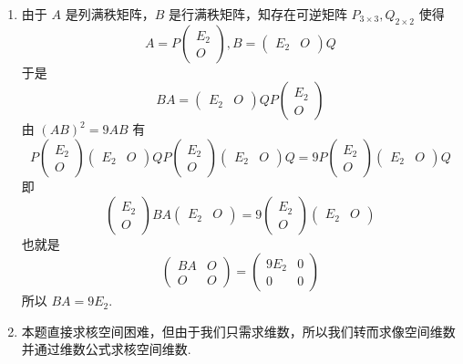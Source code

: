 \begin{enumerate}
    \item 由于 $A$ 是列满秩矩阵，$B$ 是行满秩矩阵，知存在可逆矩阵 $P_{3\times 3},Q_{2\times 2}$ 使得
          \[A=P\begin{pmatrix}E_2 \\ O\end{pmatrix},B=\begin{pmatrix}E_2 & O\end{pmatrix}Q\]
          于是
          \[BA=\begin{pmatrix}E_2 & O\end{pmatrix}QP\begin{pmatrix}E_2 \\ O\end{pmatrix}\]
          由 $(AB)^2=9AB$ 有 \[P\begin{pmatrix}E_2 \\ O\end{pmatrix}\begin{pmatrix}E_2 & O\end{pmatrix}QP\begin{pmatrix}E_2 \\ O\end{pmatrix}\begin{pmatrix}E_2 & O\end{pmatrix}Q=9P\begin{pmatrix}E_2 \\ O\end{pmatrix}\begin{pmatrix}E_2 & O\end{pmatrix}Q\]
          即
          \[\begin{pmatrix}E_2 \\ O\end{pmatrix}BA\begin{pmatrix}E_2 & O\end{pmatrix}=9\begin{pmatrix}E_2 \\ O\end{pmatrix}\begin{pmatrix}E_2 & O\end{pmatrix}\]
          也就是 \[\begin{pmatrix}BA & O \\ O & O\end{pmatrix}=\begin{pmatrix}9E_2 & 0 \\ 0 & 0\end{pmatrix}\]
          所以 $BA=9E_2$.

    \item 本题直接求核空间困难，但由于我们只需求维数，所以我们转而求像空间维数并通过维数公式求核空间维数.


\end{enumerate}
